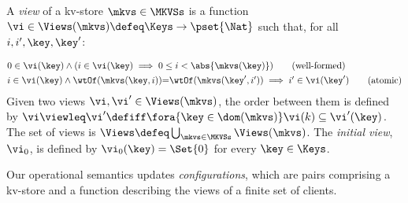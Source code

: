 
\begin{definition}[Views]
\label{def:view}
\label{def:cuts}
\label{def:views}
A \emph{view} of a kv-store $\mkvs \in \MKVSs$ is a function
$\vi \in \Views(\mkvs) \defeq \Keys \to\pset{\Nat}$ such that, for all $i, i', \key, \key'$:
%

\vspace{-5pt}
{%
\displaymathfont
\begin{align*}
    & 
    0 \in \vi(\key) 
    \land (i \in \vi(\key) \implies 0 \leq i < \abs{ \mkvs(\key) }) 
    \tag{well-formed}
    \label{eq:view.wf}\\
    & 
    \begin{array}{@{}l@{}}
	i \in \vi(\key)  
  	\land \wtOf(\mkvs(\key, i)) {=} \wtOf(\mkvs(\key', i'))  
  	\implies i' \in \vi(\key')
    \end{array}
	\tag{atomic}
	\label{eq:view.atomic}
\end{align*}
}%
Given two views $\vi, \vi' \in \Views(\mkvs)$, 
the order between them is defined by $\vi \viewleq \vi' \defiff \fora{\key \in \dom(\mkvs)} \vi(k) \subseteq \vi'(\key)$.
The set of views is $\Views \defeq \bigcup_{\mkvs \in \MKVSs} \Views(\mkvs)$.
%
\noindent The \emph{initial view}, $\vi_{0}$,  is defined by
$\vi_{0}(\key) = \Set{0}$ for every $\key \in \Keys$. 
\end{definition}

Our operational semantics updates {\em configurations},  which are pairs
comprising a kv-store and a function describing the
views of a finite set of clients. 

